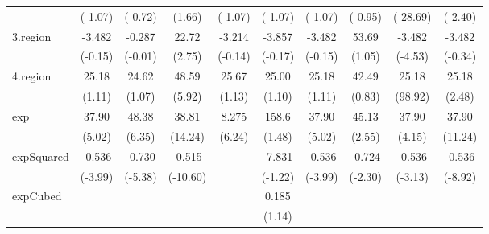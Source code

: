 \begin{table}[htbp]
\begin{tabular}{l*{9}{c}}
            &     (-1.07)         &     (-0.72)         &      (1.66)         &     (-1.07)         &     (-1.07)         &     (-1.07)         &     (-0.95)         &    (-28.69)         &     (-2.40)         \\
[1em]
3.region    &      -3.482         &      -0.287         &       22.72\sym{**} &      -3.214         &      -3.857         &      -3.482         &       53.69         &      -3.482\sym{*}  &      -3.482         \\
            &     (-0.15)         &     (-0.01)         &      (2.75)         &     (-0.14)         &     (-0.17)         &     (-0.15)         &      (1.05)         &     (-4.53)         &     (-0.34)         \\
[1em]
4.region    &       25.18         &       24.62         &       48.59\sym{***}&       25.67         &       25.00         &       25.18         &       42.49         &       25.18\sym{***}&       25.18\sym{*}  \\
            &      (1.11)         &      (1.07)         &      (5.92)         &      (1.13)         &      (1.10)         &      (1.11)         &      (0.83)         &     (98.92)         &      (2.48)         \\
[1em]
exp         &       37.90\sym{***}&       48.38\sym{***}&       38.81\sym{***}&       8.275\sym{***}&       158.6         &       37.90\sym{***}&       45.13\sym{*}  &       37.90\sym{*}  &       37.90\sym{***}\\
            &      (5.02)         &      (6.35)         &     (14.24)         &      (6.24)         &      (1.48)         &      (5.02)         &      (2.55)         &      (4.15)         &     (11.24)         \\
[1em]
expSquared  &      -0.536\sym{***}&      -0.730\sym{***}&      -0.515\sym{***}&                     &      -7.831         &      -0.536\sym{***}&      -0.724\sym{*}  &      -0.536         &      -0.536\sym{***}\\
            &     (-3.99)         &     (-5.38)         &    (-10.60)         &                     &     (-1.22)         &     (-3.99)         &     (-2.30)         &     (-3.13)         &     (-8.92)         \\
[1em]
expCubed    &                     &                     &                     &                     &       0.185         &                     &                     &                     &                     \\
            &                     &                     &                     &                     &      (1.14)         &                     &                     &                     &                     \\

\end{tabular}
\end{table}
